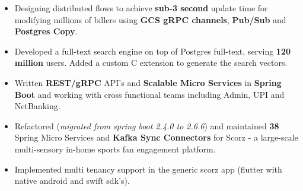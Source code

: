\documentclass[10pt,a4paper,ragged2e]{classes/altacv}
\begin{document}
\tagline{ }

\begin{fullwidth}
\makecvheader
\end{fullwidth}




\begin{itemize}[itemsep=6pt]
\normalsize
\item Designing distributed flows to achieve \textbf{sub-3 second} update time for modifying millions of billers using \textbf{GCS gRPC channels}, \textbf{Pub/Sub} and \textbf{Postgres Copy}.
\item Developed a full-text search engine on top of Postgres full-text, serving \textbf{120 million} users. Added a custom C extension to generate the search vectors.
\item Written \textbf{REST/gRPC} API's and \textbf{Scalable Micro Services} in \textbf{Spring Boot} and working with cross functional teams including Admin, UPI and NetBanking.
\end{itemize}
\vspace{6pt}
\begin{itemize}[itemsep=6pt]
\normalsize
\item Refactored (\textit{migrated from spring boot 2.4.0 to 2.6.6}) and maintained \textbf{38} Spring Micro Services and \textbf{Kafka Sync Connectors} for Scorz - a large-scale multi-sensory in-home sports fan engagement platform.
\item Implemented multi tenancy support in the generic scorz app (flutter with native android and swift sdk's).
\end{itemize}
\divider
{}
\end{document}
